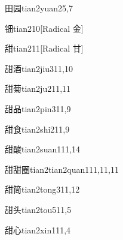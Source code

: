 \begin{entry}{田园}{tian2yuan2}{5,7}
\end{entry}

\begin{entry}{钿}{tian2}{10}[Radical 金]
\end{entry}

\begin{entry}{甜}{tian2}{11}[Radical 甘]
\end{entry}

\begin{entry}{甜酒}{tian2jiu3}{11,10}
\end{entry}

\begin{entry}{甜菊}{tian2ju2}{11,11}
\end{entry}

\begin{entry}{甜品}{tian2pin3}{11,9}
\end{entry}

\begin{entry}{甜食}{tian2shi2}{11,9}
\end{entry}

\begin{entry}{甜酸}{tian2suan1}{11,14}
\end{entry}

\begin{entry}{甜甜圈}{tian2tian2quan1}{11,11,11}
\end{entry}

\begin{entry}{甜筒}{tian2tong3}{11,12}
\end{entry}

\begin{entry}{甜头}{tian2tou5}{11,5}
\end{entry}

\begin{entry}{甜心}{tian2xin1}{11,4}
\end{entry}

